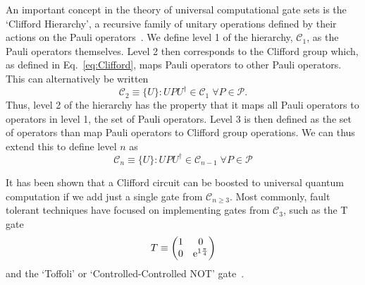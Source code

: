 \documentclass{standalone}
\begin{document}
\par
An important concept in the theory of universal computational gate sets is the `Clifford Hierarchy', a recursive family of unitary operations defined by their actions on the Pauli operators~\cite{Gottesman1999b}. We define level 1 of the hierarchy, $\mathcal{C}_{1}$, as the Pauli operators themselves. Level 2 then corresponds to the Clifford group which, as defined in Eq.~\ref{eq:Clifford}, maps Pauli operators to other Pauli operators. This can alternatively be written
\begin{equation}\label{eq:c2}
\mathcal{C}_{2} \equiv \{U\} : UPU^{\dagger}\in\mathcal{C}_{1}\;\forall P\in\mathcal{P}.
\end{equation}
Thus, level 2 of the hierarchy has the property that it maps all Pauli operators to operators in level 1, the set of Pauli operators. Level 3 is then defined as the set of operators than map Pauli operators to Clifford group operations. We can thus extend this to define level $n$ as
\begin{equation}\label{eq:heirarchy}
\mathcal{C}_{n}\equiv\{U\} : UPU^{\dagger}\in\mathcal{C}_{n-1}\;\forall P\in\mathcal{P}
\end{equation}
\par
It has been shown that a Clifford circuit can be boosted to universal quantum computation if we add just a single gate from $\mathcal{C}_{n\geq3}$. Most commonly, fault tolerant techniques have focused on implementing gates from $\mathcal{C}_{3}$, such as the T gate 
\[T\equiv\begin{pmatrix}1&0\\0&\mathrm{e}^{1\frac{\pi}{4}}\end{pmatrix}\]
and the `Toffoli' or `Controlled-Controlled NOT' gate~\cite{Shor1997,Gottesman1999b}. 
\end{document}
